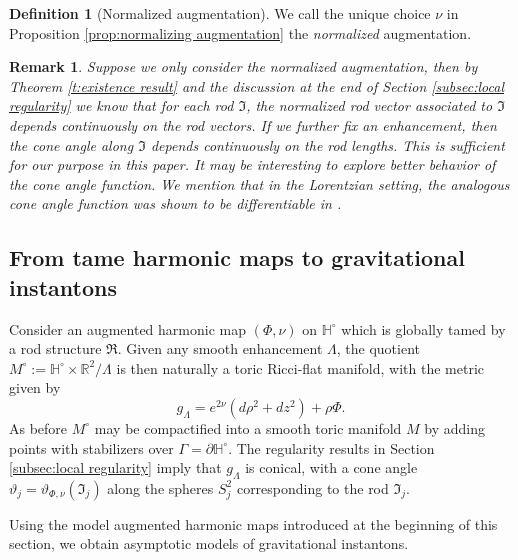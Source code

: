 \documentclass[a4paper,11pt]{amsart}
\newtheorem{remark}[theorem]{Remark}
\theoremstyle{definition}
\newtheorem{definition}[theorem]{Definition}
\numberwithin{equation}{section}
\newcommand{\p}{\partial}
\newcommand{\dH}{\mathbb{H}}
\newcommand{\mI} {\mathfrak I}
\begin{document}
\begin{definition}[Normalized augmentation]
    We call the unique choice $\nu$ in Proposition \ref{prop:normalizing augmentation} the  \emph{normalized} augmentation. 
\end{definition}

\begin{remark}\label{rem:continuity of cone angles}
Suppose we only consider the normalized augmentation, then by Theorem \ref{t:existence result} and the discussion at the end of Section \ref{subsec:local regularity} we know that for each rod $\mI$, the normalized rod vector associated to $\mI$ depends continuously on the rod vectors. If we further fix an enhancement, then the cone angle along $\mI$  depends continuously on the rod lengths. This is sufficient for our purpose in this paper. It may be interesting to explore better behavior of the cone angle function. We mention that in the Lorentzian setting, the analogous cone angle function was shown to be  differentiable in \cite{HKWX2}. 
    
\end{remark}



\subsection{From tame harmonic maps to gravitational instantons}




Consider an augmented harmonic  map $(\Phi, \nu)$ on $\dH^\circ$ which is globally tamed by a rod structure $\mathfrak R$. Given any smooth enhancement $\Lambda$, the quotient $M^\circ:=\mathbb H^\circ\times \mathbb R^2/\Lambda$ is then naturally a toric Ricci-flat manifold, with the metric given by 
\begin{equation}\label{eq:quotient toric metric}
	g_\Lambda=e^{2\nu}(d\rho^2+dz^2)+\rho\Phi.
\end{equation}
As before $M^\circ$ may be compactified into a smooth toric manifold $M$ by  adding points with stabilizers over $\Gamma=\p \mathbb H^\circ$. The regularity results in Section \ref{subsec:local regularity} imply that $g_\Lambda$ is conical,  with a cone angle $\vartheta_j=\vartheta_{\Phi, \nu}(\mI_j)$ along the spheres $S_j^2$ corresponding to the rod $\mathfrak I_j$. 


Using the model augmented harmonic maps introduced at the beginning of this section, we obtain asymptotic models of gravitational instantons. 
\end{document}
